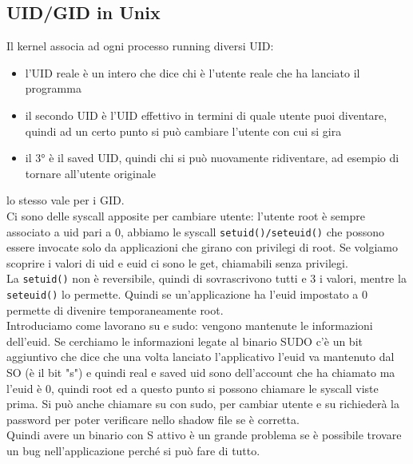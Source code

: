 \documentclass[12pt, oneside]{extbook} %
\begin{document}
\subsection{UID/GID in Unix}
Il kernel associa ad ogni processo running diversi UID:
\begin{itemize}
\item l'UID reale è un intero che dice chi è l'utente reale che ha lanciato il programma
\item il secondo UID è l'UID effettivo in termini di quale utente puoi diventare, quindi ad un certo punto si può cambiare l'utente con cui si gira
\item il 3° è il saved UID, quindi chi si può nuovamente ridiventare, ad esempio di tornare all'utente originale
\end{itemize}
lo stesso vale per i GID.\\ Ci sono delle syscall apposite per cambiare utente: l'utente root è sempre associato a uid pari a 0, abbiamo le syscall \texttt{setuid()/seteuid()} che possono essere invocate solo da applicazioni che girano con privilegi di root. Se volgiamo scoprire i valori di uid e euid ci sono le get, chiamabili senza privilegi.\\ La \texttt{setuid()} non è reversibile, quindi di sovrascrivono tutti e 3 i valori, mentre la \texttt{seteuid()} lo permette. Quindi se un'applicazione ha l'euid impostato a 0 permette di divenire temporaneamente root.\\Introduciamo come lavorano su e sudo: vengono mantenute le informazioni dell'euid. Se cerchiamo le informazioni legate al binario SUDO c'è un bit aggiuntivo che dice che una volta lanciato l'applicativo l'euid va mantenuto dal SO (è il bit "s") e quindi real e saved uid sono dell'account che ha chiamato ma l'euid è 0, quindi root ed a questo punto si possono chiamare le syscall viste prima. Si può anche chiamare su con sudo, per cambiar utente e su richiederà la password per poter verificare nello shadow file se è corretta.\\Quindi avere un binario con S attivo è un grande problema se è possibile trovare un bug nell'applicazione perché si può fare di tutto.
\end{document}
